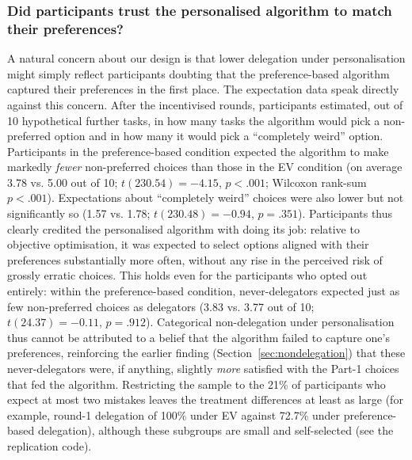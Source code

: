 \documentclass[a4paper, 12pt, fleqn]{article}
\theoremstyle{hypstyle}
\begin{document}
\subsubsection*{Did participants trust the personalised algorithm to match their preferences?}
A natural concern about our design is that lower delegation under personalisation might simply reflect participants doubting that the preference-based algorithm captured their preferences in the first place. The expectation data speak directly against this concern. After the incentivised rounds, participants estimated, out of 10 hypothetical further tasks, in how many tasks the algorithm would pick a non-preferred option and in how many it would pick a ``completely weird'' option. Participants in the preference-based condition expected the algorithm to make markedly \emph{fewer} non-preferred choices than those in the EV condition (on average 3.78 vs. 5.00 out of 10; $t(230.54) = -4.15$, $p < .001$; Wilcoxon rank-sum $p < .001$). Expectations about ``completely weird'' choices were also lower but not significantly so (1.57 vs. 1.78; $t(230.48) = -0.94$, $p = .351$). Participants thus clearly credited the personalised algorithm with doing its job: relative to objective optimisation, it was expected to select options aligned with their preferences substantially more often, without any rise in the perceived risk of grossly erratic choices. This holds even for the participants who opted out entirely: within the preference-based condition, never-delegators expected just as few non-preferred choices as delegators (3.83 vs. 3.77 out of 10; $t(24.37) = -0.11$, $p = .912$). Categorical non-delegation under personalisation thus cannot be attributed to a belief that the algorithm failed to capture one's preferences, reinforcing the earlier finding (Section~\ref{sec:nondelegation}) that these never-delegators were, if anything, slightly \emph{more} satisfied with the Part-1 choices that fed the algorithm. Restricting the sample to the 21\% of participants who expect at most two mistakes leaves the treatment differences at least as large (for example, round-1 delegation of 100\% under EV against 72.7\% under preference-based delegation), although these subgroups are small and self-selected (see the replication code).
\end{document}
